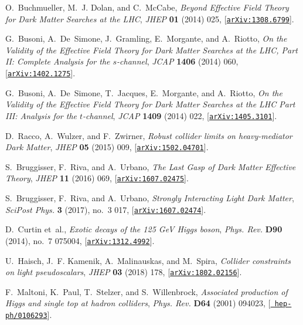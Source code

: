 \documentclass[a4paper, 11pt,notoc]{article}
\begin{document}
\begin{thebibliography}{100}
O.~Buchmueller, M.~J. Dolan, and C.~McCabe, {\it {Beyond Effective Field Theory
  for Dark Matter Searches at the LHC}},  {\em JHEP} {\bf 01} (2014) 025,
  [\href{http://arxiv.org/abs/1308.6799}{{\tt arXiv:1308.6799}}].

G.~Busoni, A.~De~Simone, J.~Gramling, E.~Morgante, and A.~Riotto, {\it {On the
  Validity of the Effective Field Theory for Dark Matter Searches at the LHC,
  Part II: Complete Analysis for the $s$-channel}},  {\em JCAP} {\bf 1406}
  (2014) 060, [\href{http://arxiv.org/abs/1402.1275}{{\tt arXiv:1402.1275}}].

G.~Busoni, A.~De~Simone, T.~Jacques, E.~Morgante, and A.~Riotto, {\it {On the
  Validity of the Effective Field Theory for Dark Matter Searches at the LHC
  Part III: Analysis for the $t$-channel}},  {\em JCAP} {\bf 1409} (2014) 022,
  [\href{http://arxiv.org/abs/1405.3101}{{\tt arXiv:1405.3101}}].

D.~Racco, A.~Wulzer, and F.~Zwirner, {\it {Robust collider limits on
  heavy-mediator Dark Matter}},  {\em JHEP} {\bf 05} (2015) 009,
  [\href{http://arxiv.org/abs/1502.04701}{{\tt arXiv:1502.04701}}].

S.~Bruggisser, F.~Riva, and A.~Urbano, {\it {The Last Gasp of Dark Matter
  Effective Theory}},  {\em JHEP} {\bf 11} (2016) 069,
  [\href{http://arxiv.org/abs/1607.02475}{{\tt arXiv:1607.02475}}].

S.~Bruggisser, F.~Riva, and A.~Urbano, {\it {Strongly Interacting Light Dark
  Matter}},  {\em SciPost Phys.} {\bf 3} (2017), no.~3 017,
  [\href{http://arxiv.org/abs/1607.02474}{{\tt arXiv:1607.02474}}].

D.~Curtin et~al., {\it {Exotic decays of the 125 GeV Higgs boson}},  {\em Phys.
  Rev.} {\bf D90} (2014), no.~7 075004,
  [\href{http://arxiv.org/abs/1312.4992}{{\tt arXiv:1312.4992}}].

U.~Haisch, J.~F. Kamenik, A.~Malinauskas, and M.~Spira, {\it {Collider
  constraints on light pseudoscalars}},  {\em JHEP} {\bf 03} (2018) 178,
  [\href{http://arxiv.org/abs/1802.02156}{{\tt arXiv:1802.02156}}].

F.~Maltoni, K.~Paul, T.~Stelzer, and S.~Willenbrock, {\it {Associated
  production of Higgs and single top at hadron colliders}},  {\em Phys. Rev.}
  {\bf D64} (2001) 094023, [\href{http://arxiv.org/abs/hep-ph/0106293}{{\tt
  hep-ph/0106293}}].


\end{thebibliography}
\end{document}
